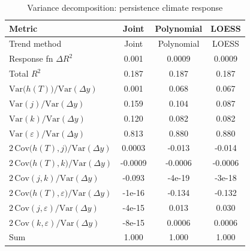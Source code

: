 \begin{table}[htbp]
\centering
\caption{Variance decomposition: persistence climate response}
\label{tab:variance_decomp_persistence}

\small
\begin{tabular}{@{}lccc@{}}
\toprule
Metric & Joint & Polynomial & LOESS \\
\midrule
Trend method & Joint & Polynomial & LOESS \\
\midrule
Response fn $\Delta R^2$ & 0.001 & 0.0009 & 0.0009 \\
Total $R^2$ & 0.187 & 0.187 & 0.187 \\
\midrule
$\mathrm{Var}\!\big(h(T)\big)/\mathrm{Var}(\Delta y)$ & 0.001 & 0.068 & 0.067 \\
$\mathrm{Var}(j)/\mathrm{Var}(\Delta y)$ & 0.159 & 0.104 & 0.087 \\
$\mathrm{Var}(k)/\mathrm{Var}(\Delta y)$ & 0.120 & 0.082 & 0.082 \\
$\mathrm{Var}(\varepsilon)/\mathrm{Var}(\Delta y)$ & 0.813 & 0.880 & 0.880 \\
\midrule
$2\,\mathrm{Cov}\!\big(h(T),j\big)/\mathrm{Var}(\Delta y)$ & 0.0003 & -0.013 & -0.014 \\
$2\,\mathrm{Cov}\!\big(h(T),k\big)/\mathrm{Var}(\Delta y)$ & -0.0009 & -0.0006 & -0.0006 \\
$2\,\mathrm{Cov}(j,k)/\mathrm{Var}(\Delta y)$ & -0.093 & -4e-19 & -3e-18 \\
$2\,\mathrm{Cov}\!\big(h(T),\varepsilon\big)/\mathrm{Var}(\Delta y)$ & -1e-16 & -0.134 & -0.132 \\
$2\,\mathrm{Cov}(j,\varepsilon)/\mathrm{Var}(\Delta y)$ & -4e-15 & 0.013 & 0.030 \\
$2\,\mathrm{Cov}(k,\varepsilon)/\mathrm{Var}(\Delta y)$ & -8e-15 & 0.0006 & 0.0006 \\
\midrule
Sum & 1.000 & 1.000 & 1.000 \\
\bottomrule
\end{tabular}
\end{table}